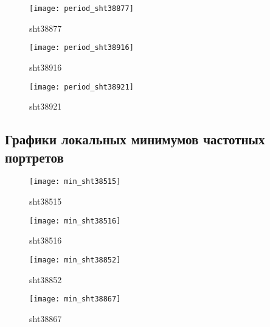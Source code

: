 \begin{figure}[H]
	\begin{minipage}[H]{0.49\linewidth}
		\begin{center}
			\texttt{[image: period\_sht38877]}
			\caption{sht38877}
		\end{center}
	\end{minipage}
	\hfill
	\begin{minipage}[H]{0.49\linewidth}
		\begin{center}
			\texttt{[image: period\_sht38916]}
			\caption{sht38916}
		\end{center}
	\end{minipage}	
\end{figure}

\begin{figure}[H]
	\begin{center}
		\texttt{[image: period\_sht38921]}
		\caption{sht38921}
	\end{center}
\end{figure}

\subsection{Графики локальных минимумов частотных портретов}

\begin{figure}[H]
	\begin{minipage}[H]{0.49\linewidth}
		\begin{center}
			\texttt{[image: min\_sht38515]}
			\caption{sht38515}
		\end{center}
	\end{minipage}
	\hfill
	\begin{minipage}[H]{0.49\linewidth}
		\begin{center}
			\texttt{[image: min\_sht38516]}
			\caption{sht38516}
		\end{center}
	\end{minipage}	
\end{figure}

\begin{figure}[H]
	\begin{minipage}[H]{0.49\linewidth}
		\begin{center}
			\texttt{[image: min\_sht38852]}
			\caption{sht38852}
		\end{center}
	\end{minipage}
	\hfill
	\begin{minipage}[H]{0.49\linewidth}
		\begin{center}
			\texttt{[image: min\_sht38867]}
			\caption{sht38867}
		\end{center}
	\end{minipage}	
\end{figure}

